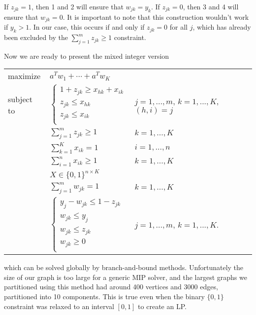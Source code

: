 If $z_{jk} = 1$, then 1 and 2 will ensure that $w_{jk} = y_k$.
If $z_{jk} = 0$, then 3 and 4 will ensure that $w_{jk} = 0$.
It is important to note that this construction wouldn't work if
$y_k > 1$. In our case, this occurs if and only if $z_{jk} = 0$ for all
$j$, which has already been excluded by the $\sum_{j=1}^m z_{jk} \geq 1$
constraint.

Now we are ready to present the mixed integer version
\begin{center}
\bgroup
\def\arraystretch{1.5}
\begin{tabular}{l l l}
maximize   & $a^T w_1 + \cdots + a^T w_K$ \\
subject to 
           & $\begin{cases}
                 1 + z_{jk} \geq x_{hk} + x_{ik} \\
                 z_{jk} \leq x_{hk}             \\
                 z_{jk} \leq x_{ik}             \\
             \end{cases}$
           & $j = 1, ..., m$, $k = 1, ..., K$, $(h,i) = j$ \\
           & $\sum_{j=1}^m z_{jk} \geq 1$ & $k = 1, ..., K$ \\
           & $\sum_{k=1}^K x_{ik} = 1$ & $i = 1, ..., n$ \\
           & $\sum_{i=1}^n x_{ik} \geq 1$ & $k = 1, ..., K$ \\
           & $X \in \{0, 1\}^{n \times K}$ \\
           & $\sum_{j=1}^m w_{jk} = 1$ & $k = 1, ..., K$ \\
           & $\begin{cases}
                y_j - w_{jk} \leq 1 - z_{jk} \\
                w_{jk} \leq y_j \\
                w_{jk} \leq z_{jk} \\
                w_{jk} \geq 0 \\
             \end{cases}$
           & $j = 1, ..., m$, $k = 1, ..., K$. \\
\end{tabular}
\egroup
\end{center}
which can be solved globally by branch-and-bound methods.
Unfortunately the size of our graph is too large for a generic MIP
solver, and the largest graphs we partitioned using this method had
around 400 vertices and 3000 edges, partitioned into 10 components.
This is true even when the binary $\{0, 1\}$ constraint was relaxed
to an interval $[0, 1]$ to create an LP.


